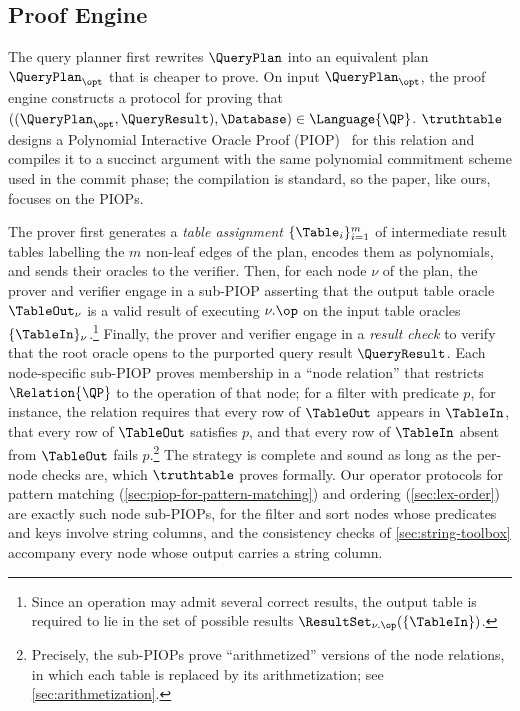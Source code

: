 \subsection{Proof Engine}
\label{sec:overview-proof-engine}

The query planner first rewrites $\QueryPlan$ into an equivalent plan $\QueryPlan_\opt$ that is cheaper to prove.
On input $\QueryPlan_\opt$, the proof engine constructs a protocol for proving that $((\QueryPlan_\opt, \QueryResult), \Database) \in \Language{\QP}$.
$\truthtable$ designs a Polynomial Interactive Oracle Proof (PIOP)~\cite{ChiesaHMMVW20,BunzFS20} for this relation and compiles it to a succinct argument with the same polynomial commitment scheme used in the commit phase; the compilation is standard, so the paper, like ours, focuses on the PIOPs.

The prover first generates a \emph{table assignment} $\{\Table_i\}_{i=1}^m$ of intermediate result tables labelling the $m$ non-leaf edges of the plan, encodes them as polynomials, and sends their oracles to the verifier.
Then, for each node $\nu$ of the plan, the prover and verifier engage in a sub-PIOP asserting that the output table oracle $\TableOut_\nu$ is a valid result of executing $\nu.\op$ on the input table oracles $\{\TableIn\}_\nu$.\footnote{Since an operation may admit several correct results, the output table is required to lie in the set of possible results $\ResultSet_{\nu.\op}(\{\TableIn\})$.}
Finally, the prover and verifier engage in a \emph{result check} to verify that the root oracle opens to the purported query result $\QueryResult$.
Each node-specific sub-PIOP proves membership in a ``node relation'' that restricts $\Relation{\QP}$ to the operation of that node; for a filter with predicate $p$, for instance, the relation requires that every row of $\TableOut$ appears in $\TableIn$, that every row of $\TableOut$ satisfies $p$, and that every row of $\TableIn$ absent from $\TableOut$ fails $p$.\footnote{Precisely, the sub-PIOPs prove ``arithmetized'' versions of the node relations, in which each table is replaced by its arithmetization; see \cref{sec:arithmetization}.}
The strategy is complete and sound as long as the per-node checks are, which $\truthtable$ proves formally.
Our operator protocols for pattern matching (\cref{sec:piop-for-pattern-matching}) and ordering (\cref{sec:lex-order}) are exactly such node sub-PIOPs, for the filter and sort nodes whose predicates and keys involve string columns, and the consistency checks of \cref{sec:string-toolbox} accompany every node whose output carries a string column.
